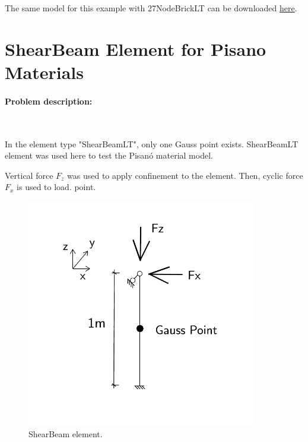 The   same   model  for  this  example  with  27NodeBrickLT  can  be  downloaded
\href{https://github.com/BorisJeremic/Real-ESSI-Examples/blob/master/model_fei_file/27NodeBrick_DRM_3D/27NodeBrick_DRM_3D.tgz?raw=true}{here}.






\section{ShearBeam Element for Pisano Materials}

\paragraph{Problem description:} ~

In  the  element  type  "ShearBeamLT",  only  one Gauss point exists. 
ShearBeamLT  element  was used here to test the Pisan{\'o}
material model.

Vertical    force    $F_z$   was used to apply confinement to the element. Then,
cyclic force  $F_x$ is  used to load. 
point.

\begin{figure}[!htb]
  \centering
  \includegraphics[width=10cm]{./Figure-files/_Chapter_Appendix_Illustrative_Examples/pisano_descrip.pdf}
  \caption{ShearBeam element.}
  \label{fig_ShearBeam}
\end{figure}



